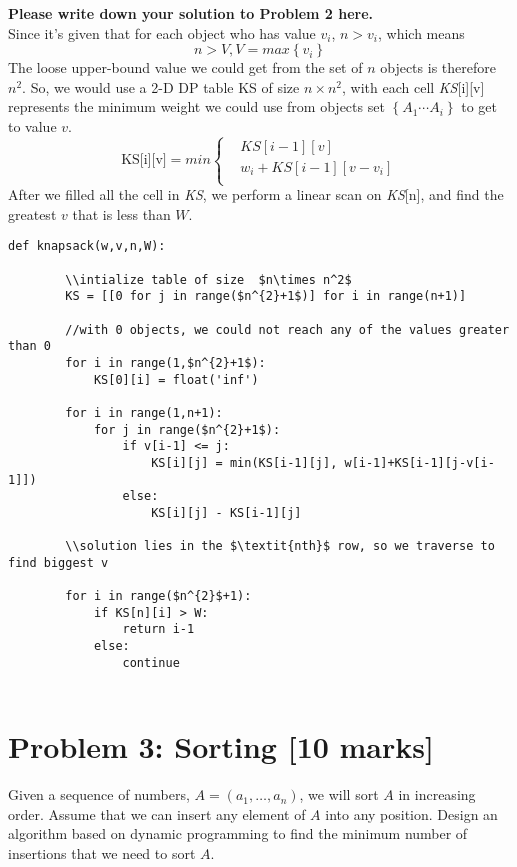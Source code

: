\documentclass[11pt,twoside]{article}
\newcommand{\problem}[1]{\section*{Problem #1}}
\newenvironment{solution}{{\par\noindent\it Solution.}}{}
\begin{document}
\begin{solution}
\textbf{Please write down your solution to Problem 2 here.}\\
Since it's given that for each object who has value $v_{i}$, $n > v_{i}$, which means $$n > V, V= \textit{max}\left\{v_{i}\right\}$$
The loose upper-bound value we could get from the set of $n$ objects is therefore $n^{2}$. So, we would use a 2-D DP table KS of size $n \times n^{2}$, with each cell \textit{KS}[i][v] represents the minimum weight we could use from objects set $\left\{A_{1}\cdots A_{i} \right\}$ to get to value $v$.\\
$$\text{KS[i][v]}=\textit{min}\left\{
\begin{aligned}
& KS[i-1][v] \\
& w_{i} + KS[i-1][v-v_{i}] \\
\end{aligned}
\right.$$
After we filled all the cell in \textit{KS}, we perform a linear scan on \textit{KS}[n], and find the greatest $v$ that is less than $W$.
\begin{lstlisting}[mathescape]
    def knapsack(w,v,n,W):
        
        \\intialize table of size  $n\times n^2$
        KS = [[0 for j in range($n^{2}+1$)] for i in range(n+1)]
        
        //with 0 objects, we could not reach any of the values greater than 0
        for i in range(1,$n^{2}+1$):
            KS[0][i] = float('inf')
            
        for i in range(1,n+1):
            for j in range($n^{2}+1$):
                if v[i-1] <= j:
                    KS[i][j] = min(KS[i-1][j], w[i-1]+KS[i-1][j-v[i-1]])
                else:
                    KS[i][j] - KS[i-1][j]
                    
        \\solution lies in the $\textit{nth}$ row, so we traverse to find biggest v

        for i in range($n^{2}$+1):
            if KS[n][i] > W:
                return i-1
            else:
                continue
        
\end{lstlisting}
\end{solution}

\problem{3: Sorting [10 marks]}
Given a sequence of numbers, $A=(a_1,\dots,a_n)$, we will sort $A$ in increasing order. Assume that we can insert any element of $A$ into any position. Design an algorithm based on dynamic programming to find the minimum number of insertions that we need to sort $A$.
\end{document}
